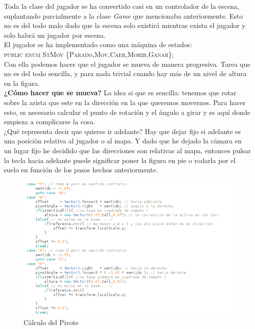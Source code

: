 \documentclass{article}
\begin{document}
Toda la clase del jugador se ha convertido casi en un controlador de la escena, suplantando parcialmente a la clase \emph{Game} que mencionaba anteriormente. Esto no es del todo malo dado que la escena solo existirá mientras exista el jugador y solo habrá un jugador por escena. \\

El jugador se ha implementado como una máquina de estados:\\
\textsc{public enum StMov \{Parado,Mov,Caer,Morir,Ganar\};}\\
Con ella podemos hacer que el jugador se mueva de manera progresiva. Tarea que no es del todo sencilla, y para nada trivial cuando hay más de un nivel de altura en la figura.\\

\textbf{¿Cómo hacer que se mueva?}
La idea si que es sencilla: tenemos que rotar sobre la arista que este en la dirección en la que queremos movernos. Para hacer esto, es necesario calcular el punto de rotación y el ángulo a girar y es aquí donde empieza a complicarse la cosa. \\

¿Qué representa decir que quieres ir adelante? Hay que dejar fijo si adelante es una posición relativa al jugador o al mapa. Y dado que he dejado la cámara en un lugar fijo he decidido que las direcciones son relativas al mapa, entonces pulsar la tecla hacia adelante puede significar poner la figura en pie o rodarla por el suelo en función de los pasos hechos anteriormente.\\

\begin{figure}[h!]
\centering
\includegraphics[scale=.75]{codigo.png}
\caption{Cálculo del Pivote}
\label{fig:codigo}
\end{figure}
\end{document}
